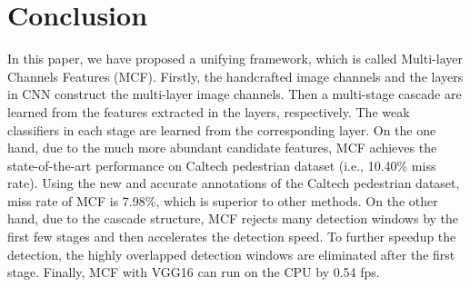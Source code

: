 \documentclass[journal]{IEEEtran}
\begin{document}
\section{Conclusion}
In this paper, we have proposed a unifying framework, which is called Multi-layer Channels Features (MCF). Firstly, the handcrafted image channels and the layers in CNN construct the multi-layer image channels. Then a multi-stage cascade are learned from the features extracted in the layers, respectively. The weak classifiers in each stage are learned from the corresponding layer. On the one hand, due to the much more abundant candidate features, MCF achieves the state-of-the-art performance on Caltech pedestrian dataset (i.e., 10.40\% miss rate). Using the new and accurate annotations of the Caltech pedestrian dataset, miss rate of MCF is 7.98\%, which is superior to other methods. On the other hand, due to the cascade structure, MCF rejects many detection windows by the first few stages and then accelerates the detection speed. To further speedup the detection, the highly overlapped detection windows are eliminated after the first stage. Finally, MCF with VGG16 can run on the CPU by 0.54 fps.






























\ifCLASSOPTIONcaptionsoff
  \newpage
\fi
\end{document}
